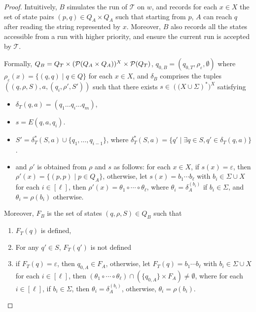 \documentclass[sigplan,review,anonymous]{acmart}\settopmatter{printfolios=true,printccs=false,printacmref=false}
\newcommand\psst{\mathcal{T}}
\begin{document}
\begin{proof}
Intuitively, $B$ simulates the run of $\psst$ on $w$, and records  for each $x \in X$ the set of state pairs $(p, q) \in Q_A \times Q_A$ such that starting from $p$, $A$ can reach $q$ after reading the string represented by $x$. Moreover, $B$ also records all the states accessible from a run with higher priority, and ensure the current run is accepted by $\psst$.

Formally, $Q_B = Q_T \times (\mathcal{P}(Q_A \times Q_A ))^{X} \times \mathcal{P}(Q_T)  $, $q_{0, B} = (q_{0, T}, \rho_{\varepsilon}, \emptyset)$ where $\rho_{\varepsilon} (x) = \{(q, q) \mid q \in Q\}$ for each $x \in X$, and $\delta_{B}$ comprises the tuples $((q, \rho, S), a, (q_i, \rho', S'))$ such that there exists $s \in \left((X \cup \Sigma\right)^*)^X$ satisfying
\begin{itemize}
\item $\delta_T (q, a) = (q_1 \ldots q_i \ldots q_m)$, 
\item $s = E(q,a,q_i)$.
\item $S' = \delta_T^{\ast} (S, a) \cup \{ q_1, \ldots, q_{i - 1} \}$, where $\delta_T^{\ast}(S,a) = \{q' \mid \exists q \in S, q' \in \delta_T(q,a)\}$.
\item and $\rho'$ is obtained from $\rho$ and $s$ as follows: for each $x \in X$, if $s(x) = \varepsilon$, then $\rho'(x) = \{(p, p) \mid p \in Q_A\}$, otherwise, let $s(x) = b_1 \cdots b_\ell$ with $b_i \in \Sigma \cup X$ for each $i \in [\ell]$, then $\rho'(x) = \theta_1 \circ \cdots \circ \theta_\ell$, where $\theta_i = \delta^{(b_i)}_A$ if $b_i \in \Sigma$, and $\theta_i = \rho(b_i)$ otherwise.
%
\end{itemize}

Moreover, $F_B$ is the set of states $(q, \rho, S) \in Q_B$
such that
\begin{enumerate}
  \item $F_T (q)$ is defined,
  \item For any $q' \in S$, $F_T (q')$ is not defined
  
  \item if $F_T(q) = \varepsilon$, then $q_{0, A}  \in F_A$, otherwise, 
let $F_T(q) = b_1 \cdots b_\ell$ with $b_i \in \Sigma \cup X$ for each $i \in [\ell]$, then $(\theta_1 \circ \cdots \circ \theta_\ell) \cap (\{q_{0,A}\} \times F_A) \neq \emptyset$, where for each $i \in [\ell]$, if $b_i \in \Sigma$, then $\theta_i = \delta^{(b_i)}_A$, otherwise, $\theta_i = \rho(b_i)$.
\end{enumerate}
\end{proof}
\end{document}
